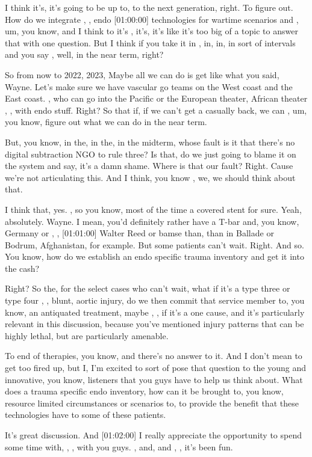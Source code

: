 \documentclass[
]{book}
\begin{document}
I think it's, it's going to be up to, to the next generation, right. To
figure out. How do we integrate , , endo {[}01:00:00{]} technologies for
wartime scenarios and , um, you know, and I think to it's , it's, it's
like it's too big of a topic to answer that with one question. But I
think if you take it in , in, in, in sort of intervals and you say ,
well, in the near term, right?

So from now to 2022, 2023, Maybe all we can do is get like what you
said, Wayne. Let's make sure we have vascular go teams on the West coast
and the East coast. , who can go into the Pacific or the European
theater, African theater , , with endo stuff. Right? So that if, if we
can't get a casually back, we can , um, you know, figure out what we can
do in the near term.

But, you know, in the, in the, in the midterm, whose fault is it that
there's no digital subtraction NGO to rule three? Is that, do we just
going to blame it on the system and say, it's a damn shame. Where is
that our fault? Right. Cause we're not articulating this. And I think,
you know , we, we should think about that.

I think that, yes. , so you know, most of the time a covered stent for
sure. Yeah, absolutely. Wayne. I mean, you'd definitely rather have a
T-bar and, you know, Germany or , , {[}01:01:00{]} Walter Reed or bamse
than, than in Ballade or Bodrum, Afghanistan, for example. But some
patients can't wait. Right. And so. You know, how do we establish an
endo specific trauma inventory and get it into the cash?

Right? So the, for the select cases who can't wait, what if it's a type
three or type four , , blunt, aortic injury, do we then commit that
service member to, you know, an antiquated treatment, maybe , , if it's
a one cause, and it's particularly relevant in this discussion, because
you've mentioned injury patterns that can be highly lethal, but are
particularly amenable.

To end of therapies, you know, and there's no answer to it. And I don't
mean to get too fired up, but I, I'm excited to sort of pose that
question to the young and innovative, you know, listeners that you guys
have to help us think about. What does a trauma specific endo inventory,
how can it be brought to, you know, resource limited circumstances or
scenarios to, to provide the benefit that these technologies have to
some of these patients.

It's great discussion. And {[}01:02:00{]} I really appreciate the
opportunity to spend some time with, , , with you guys. , and, and , ,
it's been fun.
\end{document}
